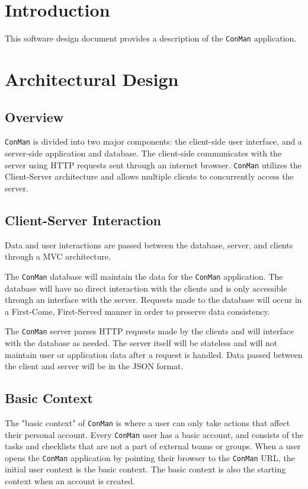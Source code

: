 \documentclass{article}
\begin{document}

\normalsize

\newpage
\tableofcontents

\newpage
\section{Introduction}
This software design document provides a description of the \texttt{ConMan} application. 

\newpage
\section{Architectural Design}
\subsection{Overview}
\texttt{ConMan} is divided into two major components: the client-side user interface, and a server-side application and database.
The client-side communicates with the server using HTTP requests sent through an internet browser.  
\texttt{ConMan} utilizes the Client-Server architecture and allows multiple clients to concurrently access the server.  

\subsection{Client-Server Interaction}
Data and user interactions are passed between the database, server, and clients through a MVC architecture.

The \texttt{ConMan} database will maintain the data for the \texttt{ConMan} application.  
The database will have no direct interaction with the clients and is only accessible through an interface with the server.
Requests made to the database will occur in a First-Come, First-Served manner in order to preserve data consistency.

The \texttt{ConMan} server parses HTTP requests made by the clients and will interface with the database as needed.  
The server itself will be stateless and will not maintain user or application data after a request is handled.
Data passed between the client and server will be in the JSON format.

\subsection{Basic Context}
The "basic context" of \texttt{ConMan} is where a user can only take actions that affect their personal account.
Every \texttt{ConMan} user has a basic account, and consists of the tasks and checklists that are not a part of external teams or groups.
When a user opens the \texttt{ConMan} application by pointing their browser to the \texttt{ConMan} URL, the initial user context is the basic context.
The basic context is also the starting context when an account is created.
\end{document}
